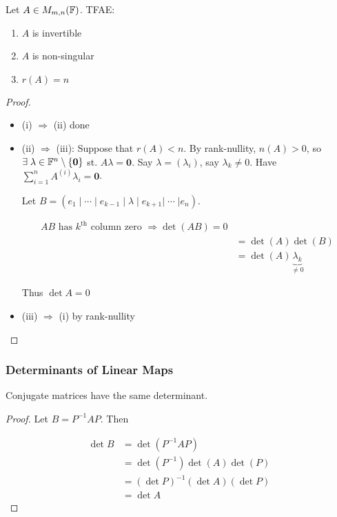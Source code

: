 \documentclass[a4paper]{article}
\begin{document}
\begin{thm} 
	Let $ A \in M_{m,n}(\mathbb{F}) $. TFAE:
	\begin{enumerate}
		\item $ A $ is invertible
		\item $ A $ is non-singular
		\item $ r(A) = n $
	\end{enumerate}
\end{thm}

\begin{proof}
	\begin{itemize}
		\item (i) $ \Rightarrow $ (ii) done
		\item (ii) $ \Rightarrow $ (iii): Suppose that $ r(A) < n $. By rank-nullity, $ n(A) > 0 $, so $ \exists \; \lambda \in \mathbb{F}^{n} \setminus \{ \mathbf{0} \} $ st. $ A \lambda = \mathbf{0} $. Say $ \lambda = (\lambda_{i}) $, say $ \lambda_{k} \neq 0 $. Have $ \sum_{i=1}^{n} A^{(i)}\lambda_{i} = \mathbf{0} $.
		
		Let $ B = ( e_{1} \; | \; \cdots \; | \; e_{k-1} \; | \; \lambda \; | \; e_{k+1} | \; \cdots \; | e_{n}  ) $.
		
		\begin{align*}
		AB \text{ has } k^{\text{th}} \text{ column zero } \Rightarrow \det(AB) = 0 \\
		& = \det(A)\det(B) \\
		& = \det(A)\underbrace{\lambda_{k}}_{\neq 0}
		\end{align*}
		
		Thus $ \det A = 0 $
		
		\item (iii) $ \Rightarrow $ (i) by rank-nullity
	\end{itemize}
\end{proof}


\subsubsection{Determinants of Linear Maps}
\begin{lemma} 
	Conjugate matrices have the same determinant.
\end{lemma}

\begin{proof}
	Let $ B = P^{-1}AP $. Then
	
	\begin{align*}
	\det B & = \det(P^{-1}AP) \\
	& = \det(P^{-1})\det(A)\det(P) \\
	& = (\det P)^{-1}(\det A)(\det P) \\
	& = \det A
	\end{align*}
\end{proof}
\end{document}
